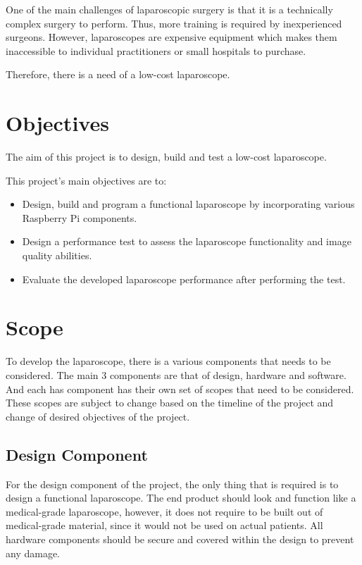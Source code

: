 \vspace{0.5cm}
\noindent
One of the main challenges of laparoscopic surgery is that it is a technically complex surgery to perform. Thus, more training is required by inexperienced surgeons. However, laparoscopes are expensive equipment which makes them inaccessible to individual practitioners or small hospitals to purchase. \citep{JSE-2014}

\vspace{0.5cm}
\noindent
Therefore, there is a need of a low-cost laparoscope.


\section{Objectives}

The aim of this project is to design, build and test a low-cost laparoscope.

This project's main objectives are to:
\begin{itemize}
    \item Design, build and program a functional laparoscope by incorporating various Raspberry Pi components.
    \item Design a performance test to assess the laparoscope functionality and image quality abilities.
    \item Evaluate the developed laparoscope performance after performing the test.
\end{itemize}

\section{Scope}
\label{sec:Scope}

To develop the laparoscope, there is a various components that needs to be considered. The main 3 components are that of design, hardware and software. And each has component has their own set of scopes that need to be considered. These scopes are subject to change based on the timeline of the project and change of desired objectives of the project.

\subsection{Design Component}

For the design component of the project, the only thing that is required is to design a functional laparoscope. The end product should look and function like a medical-grade laparoscope, however, it does not require to be built out of medical-grade material, since it would not be used on actual patients. All hardware components should be secure and covered within the design to prevent any damage.

